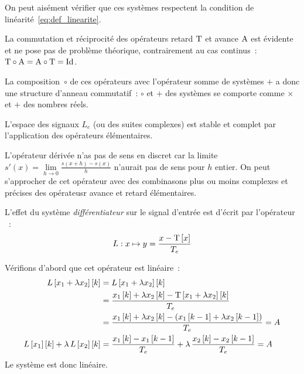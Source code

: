 On peut aisément vérifier que ces systèmes respectent la condition de
linéarité~\ref{eq:def_linearite}.

\begin{remarque}
  La commutation et réciprocité des opérateurs retard $\mathrm{T}$ et
  avance $\mathrm{A}$ est évidente et ne pose pas de problème théorique,
  contrairement au cas continus~:
  $\mathrm{T}\circ\mathrm{A}=\mathrm{A}\circ\mathrm{T}=\mathrm{Id}$.

  La composition~$\circ$ de ces opérateurs avec l'opérateur somme de
  systèmes $+$ a donc une structure d'anneau commutatif~: $\circ$ et
  $+$ des systèmes se comporte comme $\times$ et $+$ des nombres
  réels.

  L'espace des signaux $L_e$ (ou des suites complexes) est stable et
  complet par l'application des opérateurs élémentaires.
\end{remarque}

L'opérateur dérivée n'as pas de sens en discret car la limite
$s'(x)=\lim\limits_{h\to 0} \frac{s(x+h)-s(x)}{h}$ n'aurait pas de
sens pour $h$ entier. On peut s'approcher de cet opérateur avec des
combinasons plus ou moins complexes et précises des opérateusr avance et
retard élémentaires.

\begin{exemple}
  \label{exemple:differentiateur_lineaire}
  L'effet du système \emph{différentiateur} sur le signal d'entrée est d'écrit par
  l'opérateur ~: $$L : x \mapsto y=\frac{x-\mathrm{T}\left[x\right]}{T_e}$$
  
  Vérifions d'abord que cet opérateur est linéaire~:
  \begin{eqnarray*}
    L\left[x_1+\lambda x_2\right]\left[k\right] &= L\left[x_1+\lambda x_2\right]\left[k\right]\\
                              &= \frac{x_1\left[k\right]+\lambda x_2\left[k\right] - \mathrm{T}\left[x_1+\lambda x_2\right]\left[k\right]}{T_e}\\
                              &= \frac{x_1\left[k\right]+\lambda x_2\left[k\right] - \left(x_1\left[k-1\right]+\lambda x_2\left[k-1\right]\right)}{T_e} = A\\
    L\left[x_{1}\right]\left[k\right]+\lambda\,L\left[x_{2}\right]\left[k\right]  &= \frac{x_1\left[k\right] - x_1\left[k-1\right]}{T_e}+\lambda\,\frac{x_2\left[k\right] - x_2\left[k-1\right]}{T_e}=A
  \end{eqnarray*}
  Le système est donc linéaire.
\end{exemple}


